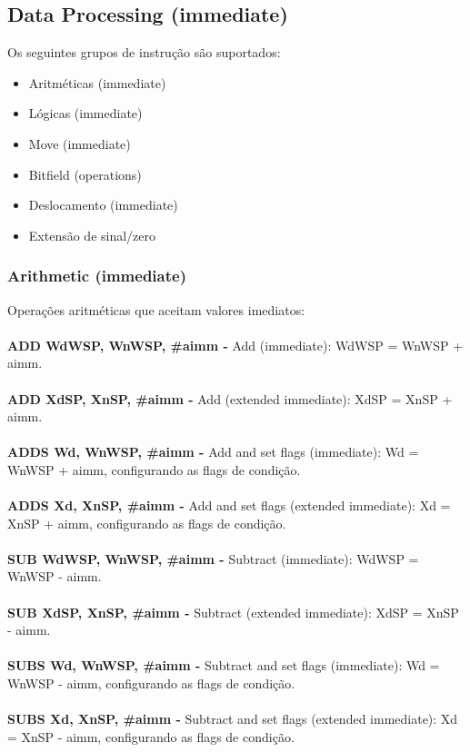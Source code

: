 \documentclass[12pt,a4paper,utf8]{ppgsi}
\begin{document}
\subsection{Data Processing (immediate)}
Os seguintes grupos de instrução são suportados:
\begin{itemize}
      \item Aritméticas (immediate)
      \item Lógicas (immediate)
      \item Move (immediate)
      \item Bitfield (operations) 
      \item Deslocamento (immediate) 
      \item Extensão de sinal/zero
\end{itemize}
\subsubsection{Arithmetic (immediate)}
Operações aritméticas que aceitam valores imediatos:
\\\\\textbf{ADD Wd\textbar WSP, Wn\textbar WSP, \#aimm -} Add (immediate): Wd\textbar WSP = Wn\textbar WSP + aimm.
\\\\\textbf{ADD Xd\textbar SP, Xn\textbar SP, \#aimm -} Add (extended immediate): Xd\textbar SP = Xn\textbar SP + aimm.
\\\\\textbf{ADDS Wd, Wn\textbar WSP, \#aimm -} Add and set flags (immediate): Wd = Wn\textbar WSP + aimm, configurando as flags de condição.
\\\\\textbf{ADDS Xd, Xn\textbar SP, \#aimm -} Add and set flags (extended immediate): Xd = Xn\textbar SP + aimm, configurando as flags de condição.
\\\\\textbf{SUB Wd\textbar WSP, Wn\textbar WSP, \#aimm -} Subtract (immediate): Wd\textbar WSP = Wn\textbar WSP - aimm.
\\\\\textbf{SUB Xd\textbar SP, Xn\textbar SP, \#aimm -} Subtract (extended immediate): Xd\textbar SP = Xn\textbar SP - aimm.
\\\\\textbf{SUBS Wd, Wn\textbar WSP, \#aimm -} Subtract and set flags (immediate): Wd = Wn\textbar WSP - aimm, configurando as flags de condição.
\\\\\textbf{SUBS Xd, Xn\textbar SP, \#aimm -} Subtract and set flags (extended immediate): Xd = Xn\textbar SP - aimm, configurando as flags de condição.
\end{document}

